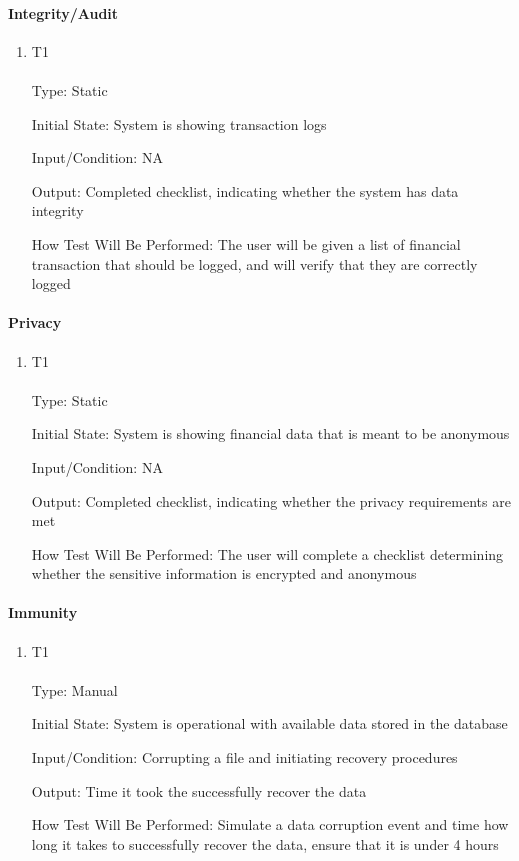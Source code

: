 \documentclass[12pt, titlepage]{article}
\begin{document}
\paragraph{Integrity/Audit}
\begin{enumerate}
\item {T1\\}\\
Type: Static

Initial State: System is showing transaction logs

Input/Condition: NA

Output: Completed checklist, indicating whether the system has data integrity

How Test Will Be Performed: The user will be given a list of financial transaction that should be logged, and will verify that they are correctly logged
\end{enumerate}
\paragraph{Privacy}
\begin{enumerate}
\item {T1\\}\\
Type: Static

Initial State: System is showing financial data that is meant to be anonymous

Input/Condition: NA

Output: Completed checklist, indicating whether the privacy requirements are met

How Test Will Be Performed: The user will complete a checklist determining whether the sensitive information is encrypted and anonymous
\end{enumerate}
\paragraph{Immunity}
\begin{enumerate}
\item {T1\\}\\
Type: Manual

Initial State: System is operational with available data stored in the database

Input/Condition: Corrupting a file and initiating recovery procedures

Output: Time it took the successfully recover the data

How Test Will Be Performed: Simulate a data corruption event and time how long it takes to successfully recover the data, ensure that it is under 4 hours
\end{enumerate}
\end{document}
